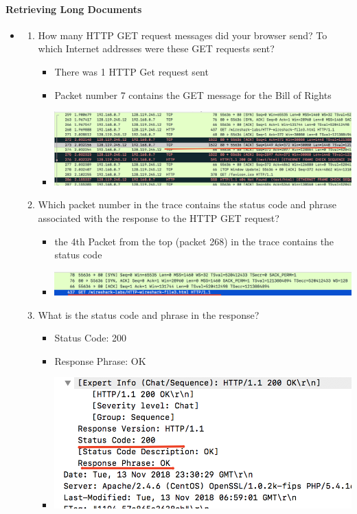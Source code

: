 \documentclass{article}
\begin{document}
  \paragraph{Retrieving Long Documents}
  \begin{itemize}
    \item\begin{enumerate}
      \item How many HTTP GET request messages did your browser send? To which Internet addresses were these GET requests sent?
        \begin{itemize}
          \item There was 1 HTTP Get request sent
          \item Packet number 7 contains the GET message for the Bill of Rights
          \item \includegraphics[scale=0.5]{images/HTTP12.png}
        \end{itemize}

      \item Which packet number in the trace contains the status code and phrase associated with the response to the HTTP GET request?
      \begin{itemize}
        \item the 4th Packet from the top (packet 268) in the trace contains the status code 
        \item \includegraphics[scale=0.5]{images/HTTP13b.png}
      \end{itemize}
  
       \item What is the status code and phrase in the response?
          \begin{itemize}
            \item Status Code: 200
            \item Response Phrase: OK
            \item \includegraphics[scale=0.5]{images/HTTP15.png}
        \end{itemize}


\end{enumerate}
\end{itemize}
\end{document}
